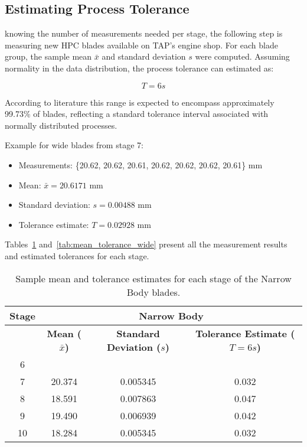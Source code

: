 \subsection{Estimating Process Tolerance}

knowing the number of measurements needed per stage, the following step is measuring new \gls{HPC} blades available on \gls{TAP}'s engine shop.
For each blade group, the sample mean \(\bar{x}\) and standard deviation \(s\) were computed. Assuming normality in the data distribution, the process tolerance can estimated as:

\[
T = 6s
\]

According to literature this range is expected to encompass approximately 99.73\% of blades, reflecting a standard tolerance interval associated with normally distributed processes.

Example for wide blades from stage 7:

\begin{itemize}
    \item Measurements: \{20.62, 20.62, 20.61, 20.62, 20.62, 20.62, 20.61\} mm
    \item Mean: \(\bar{x} = 20.6171\) mm
    \item Standard deviation: \(s = 0.00488\) mm
    \item Tolerance estimate: \(T = 0.02928\) mm
\end{itemize}

Tables~\ref{tab:mean_tolerance_narrow} and~\ref{tab:mean_tolerance_wide} present all the measurement results and estimated tolerances for each stage.

\begin{table}[H]
    \centering
    \caption{Sample mean and tolerance estimates for each stage of the Narrow Body blades.}
    \label{tab:mean_tolerance_narrow}
    \begin{tabular}{cccc}
        \hline
        \textbf{Stage} & \multicolumn{3}{c|}{\textbf{Narrow Body}} \\
        \hline
        & \textbf{Mean (\( \bar{x} \))} & \textbf{Standard Deviation (\( s \))} & \textbf{Tolerance Estimate (\( T = 6s \))} \\
        \hline
        6  &  &  &  \\
        7  & 20.374 & 0.005345 & 0.032 \\
        8  & 18.591 & 0.007863  & 0.047 \\
        9  & 19.490 & 0.006939  & 0.042 \\
        10 & 18.284 & 0.005345  & 0.032 \\
        \hline
    \end{tabular}
\end{table}

